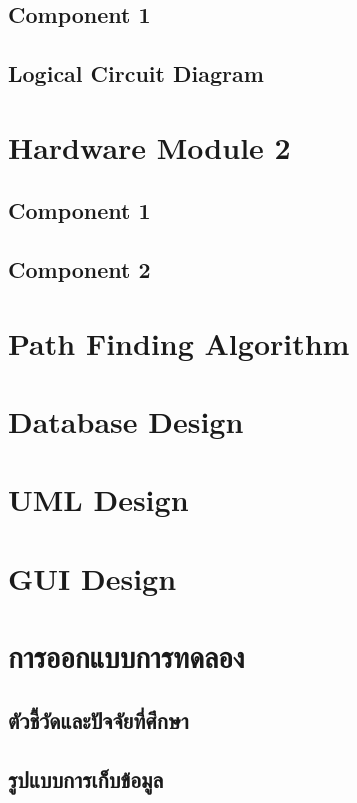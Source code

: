 \subsection{Component 1}
\subsection{Logical Circuit Diagram}

\section{Hardware Module 2}
\subsection{Component 1}
\subsection{Component 2}

\section{Path Finding Algorithm}

\section{Database Design}

\section{UML Design}

\section{GUI Design}

\section{การออกแบบการทดลอง}
\subsection{ตัวชี้วัดและปัจจัยที่ศึกษา}
\subsection{รูปแบบการเก็บข้อมูล}